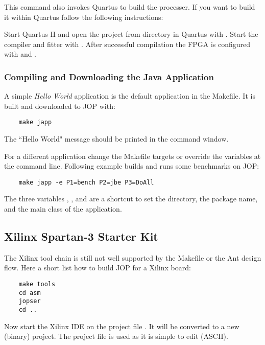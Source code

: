 This command also invokes Quartus to build the processer. If you
want to build it within Quartus follow the following instructions:

\label{subsubsec:quartus}

Start Quartus II and open the project  from directory
 in Quartus with . Start the compiler and fitter with . After successful compilation the FPGA is
configured with  and .

\subsubsection{Compiling and Downloading the Java Application}

A simple \emph{Hello World} application is the default application
in the Makefile. It is built and downloaded to JOP with:

\begin{verbatim}
    make japp
\end{verbatim}

The ``Hello World" message should be printed in the command window.

For a different application change the Makefile targets or override
the  variables at the command line. Following example
builds and runs some benchmarks on JOP:

\begin{verbatim}
    make japp -e P1=bench P2=jbe P3=DoAll
\end{verbatim}

The three variables , , and  are a
shortcut to set the directory, the package name, and the main class
of the application.

\subsection{Xilinx Spartan-3 Starter Kit}

 The Xilinx tool chain is still not well supported by
the Makefile or the Ant design flow. Here a short list how to build
JOP for a Xilinx board:

\begin{verbatim}
    make tools
    cd asm
    jopser
    cd ..
\end{verbatim}


Now start the Xilinx IDE on the project file . It will
be converted to a new (binary)  project. The
 project file is used as it is simple to edit (ASCII).

